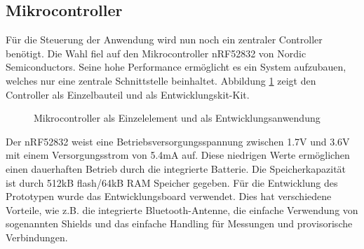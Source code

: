 \subsection{Mikrocontroller} \label{sec:microcontrollerHardware}
Für die Steuerung der Anwendung wird nun noch ein zentraler Controller benötigt. Die Wahl fiel auf den Mikrocontroller nRF52832 von Nordic Semiconductors. Seine hohe Performance ermöglicht es ein System aufzubauen, welches nur eine zentrale Schnittstelle beinhaltet. Abbildung \ref{fig:nRF52832} zeigt den Controller als Einzelbauteil und als Entwicklungskit-Kit.


\begin{figure}[H]
	\centering
	\quad
	\quad
	\caption[Mikrocontroller NRF52832]{Mikrocontroller als Einzelelement und als Entwicklungsanwendung}
	\label{fig:nRF52832}
\end{figure}

Der nRF52832 weist eine Betriebsversorgungsspannung zwischen 1.7V und 3.6V mit einem Versorgungsstrom von 5.4mA auf. Diese niedrigen Werte ermöglichen einen dauerhaften Betrieb durch die integrierte Batterie. Die Speicherkapazität ist durch 512kB flash/64kB RAM Speicher gegeben. Für die Entwicklung des Prototypen wurde das Entwicklungsboard verwendet. Dies hat verschiedene Vorteile, wie z.B. die integrierte Bluetooth-Antenne, die einfache Verwendung von sogenannten Shields und das einfache Handling für Messungen und provisorische Verbindungen.